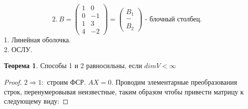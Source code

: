 \documentclass[a4paper, 12pt]{article}
\theoremstyle{definition}
\newtheorem*{theorem}{Теорема}
\begin{document}
    $$2.\ B = 
    \begin{pmatrix}
        1 & 0\\
        0 & -1\\
        \hline
        1 & 3\\
        4 & -2
    \end{pmatrix} = 
    \begin{pmatrix}
        B_1\\
        -\\
        B_2
    \end{pmatrix} \text{ - блочный столбец.}$$
    1. Линейная оболочка.\\ 2. ОСЛУ.
    \begin{theorem}
        Способы 1 и 2 равносильны, если $dimV<\infty$
    \end{theorem}
    \begin{proof}
    $2 \Longrightarrow  1:$ строим ФСР. $AX = 0$. Проводим элементарные
    преобразования строк, перенумеровывая неизвестные, таким
    образом чтобы привести матрицу к следующему виду:
    

\end{proof}
\end{document}
